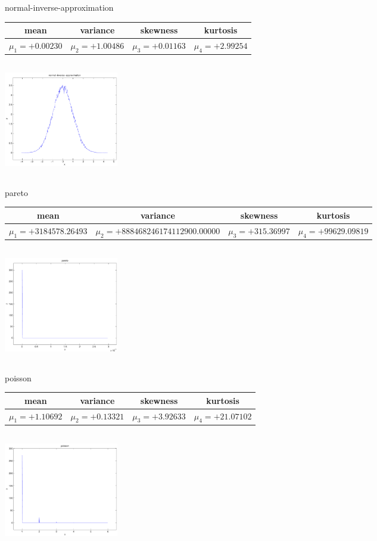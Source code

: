 \documentclass[9pt]{article}
\theoremstyle{plain}
\theoremstyle{definition}
\theoremstyle{remark}
\numberwithin{equation}{section}
\begin{document}
\newpage
normal-inverse-approximation \begin{tabular}{|c|c|c|c|}  mean & variance & skewness & kurtosis \\  \hline
$\mu_1 = +0.00230$ & $\mu_2 = +1.00486$ & $\mu_3 = +0.01163$ & $\mu_4 =+2.99254$ \\
\end{tabular}

\includegraphics[width=5cm,height=5cm]{normal-inverse-approximation.pdf}

pareto \begin{tabular}{|c|c|c|c|}  mean & variance & skewness & kurtosis \\  \hline
$\mu_1 = +3184578.26493$ & $\mu_2 = +888468246174112900.00000$ & $\mu_3 = +315.36997$ & $\mu_4 =+99629.09819$ \\
\end{tabular}

\includegraphics[width=5cm,height=5cm]{pareto.pdf}

poisson \begin{tabular}{|c|c|c|c|}  mean & variance & skewness & kurtosis \\  \hline
$\mu_1 = +1.10692$ & $\mu_2 = +0.13321$ & $\mu_3 = +3.92633$ & $\mu_4 =+21.07102$ \\
\end{tabular}

\includegraphics[width=5cm,height=5cm]{poisson.pdf}
\end{document}

